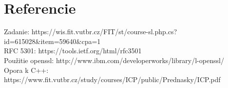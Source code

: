 \documentclass{article}
\begin{document}
\section{Referencie}
Zadanie: https://wis.fit.vutbr.cz/FIT/st/course-sl.php.cs?id=615028\&item=59640\&cpa=1\\
RFC 5301: https://tools.ietf.org/html/rfc3501\\
Použitie openssl: http://www.ibm.com/developerworks/library/l-openssl/\\
Opora k C++: https://www.fit.vutbr.cz/study/courses/ICP/public/Prednasky/ICP.pdf\\
\end{document}
